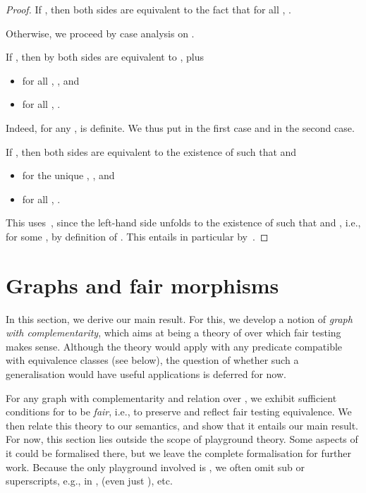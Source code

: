 \documentclass{LMCS}
\theoremstyle{plain}\newtheorem{satz}[thm]{Satz}
\begin{document}
\begin{proof}
  If , then both sides are equivalent to the fact that
  for all , .

  Otherwise, we proceed by case analysis on . 

  If , then by  both sides are
  equivalent to , plus
  \begin{itemize}
  \item for all , , and
  \item for all , .
  \end{itemize}
  Indeed, for any ,  is definite.  We thus put  in the first case and  in the second
  case.

  If , then both sides are equivalent to 
  the existence of  such that 
   and
  \begin{itemize}
  \item for the unique , , and
  \item for all , .
  \end{itemize}
  This uses~, since the left-hand side unfolds to
  the existence of  such that  and , i.e.,  for some , by definition of
  . This entails in particular 
  by~.
\end{proof}



\section{Graphs and fair morphisms}\label{sec:graphs}
In this section, we derive our main result.  For this, we develop a
notion of \emph{graph with complementarity}, which aims at being a
theory of \ltss{} over which fair testing makes sense.  Although the
theory would apply with any predicate  compatible with
 equivalence classes (see below), the question of
whether such a generalisation would have useful applications is
deferred for now.

For any graph with complementarity  and relation  over , we exhibit sufficient conditions for  to be
\emph{fair}, i.e., to preserve and reflect fair testing
equivalence. We then relate this theory to our semantics, and show
that it entails our main result.  For now, this section lies outside
the scope of playground theory. Some aspects of it could be formalised
there, but we leave the complete formalisation for further
work. Because the only playground involved is , we often omit
sub or superscripts, e.g., in ,  (even just ),
etc.
\end{document}
